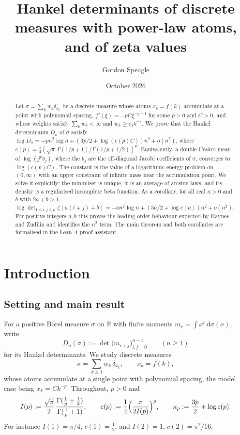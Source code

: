 \documentclass{amsart}
\title[Hankel determinants with power-law atoms]{Hankel determinants of discrete measures with power-law atoms, and of zeta values}
\author{Gordon Speagle}
\date{October 2026}
\theoremstyle{definition}
\theoremstyle{remark}
\numberwithin{equation}{section}
\newcommand{\R}{\mathbb{R}}
\newcommand{\dd}{\,\mathrm{d}}
\begin{document}
\begin{abstract}
Let $\sigma=\sum_kw_k\delta_{x_k}$ be a discrete measure whose atoms $x_k=f(k)$ accumulate at a point with polynomial
spacing, $f'(\xi)\sim-pC\xi^{-p-1}$ for some $p>0$ and $C>0$, and whose weights satisfy $\sum_kw_k<\infty$ and
$w_k\ge c_1k^{-s}$. We prove that the Hankel determinants $D_n$ of $\sigma$ satisfy
$\log D_n=-pn^2\log n+(3p/2+\log(c(p)C))n^2+o(n^2)$, where
$c(p)=\frac14(\sqrt\pi\,\Gamma(1/p+1)/\Gamma(1/p+1/2))^p$. Equivalently, a double Ces\`aro mean of $\log(j^pb_j)$,
where the $b_j$ are the off-diagonal Jacobi coefficients of $\sigma$, converges to $\log(c(p)C)$. The constant is the
value of a logarithmic energy problem on $(0,\infty)$ with an upper constraint of infinite mass near the accumulation
point. We solve it explicitly: the minimiser is unique, it is an average of arcsine laws, and its density is a
regularised incomplete beta function. As a corollary, for all real $a>0$ and $b$ with $2a+b>1$,
$\log\det_{1\le i,j\le n}\zeta(a(i+j)+b)=-an^2\log n+(3a/2+\log c(a))n^2+o(n^2)$. For positive integers $a,b$ this
proves the leading-order behaviour expected by Haynes and Zudilin and identifies the $n^2$ term. The main theorem and
both corollaries are formalised in the Lean~4 proof assistant.
\end{abstract}
\maketitle

\section{Introduction}\label{sec:intro}

\subsection{Setting and main result}
For a positive Borel measure $\sigma$ on $\R$ with finite moments $m_r=\int x^r\dd\sigma(x)$, write
\[
  D_n(\sigma):=\det\bigl(m_{i+j}\bigr)_{i,j=0}^{n-1}\qquad(n\ge1)
\]
for its Hankel determinants. We study discrete measures
\begin{equation}\label{eq:sigma}
  \sigma=\sum_{k\ge1}w_k\,\delta_{x_k},\qquad x_k=f(k),
\end{equation}
whose atoms accumulate at a single point with polynomial spacing, the model case being $x_k=Ck^{-p}$. Throughout,
$p>0$ and
\begin{equation}\label{eq:constants}
  I(p):=\frac{\sqrt\pi}{2}\,\frac{\Gamma(\frac1p+\frac12)}{\Gamma(\frac1p+1)},\qquad
  c(p):=\frac14\Bigl(\frac{\pi}{2I(p)}\Bigr)^{p},\qquad
  \kappa_p:=\frac{3p}{2}+\log c(p).
\end{equation}
For instance $I(1)=\pi/4$, $c(1)=\tfrac12$, and $I(2)=1$, $c(2)=\pi^2/16$.
\end{document}
